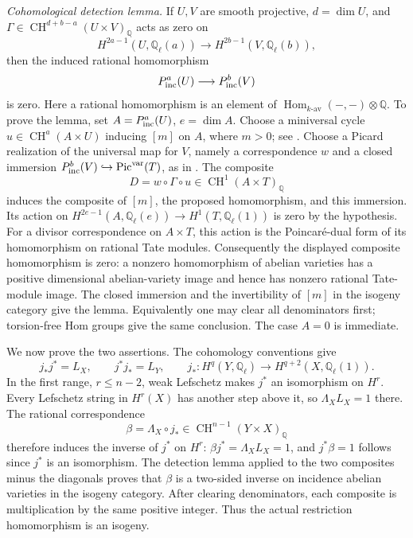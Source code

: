 \emph{Cohomological detection lemma.}
If $U,V$ are smooth projective, $d=\dim U$, and
$\Gamma\in\operatorname{CH}^{d+b-a}(U\times V)_{\mathbb Q}$
acts as zero on
\[
 H^{2a-1}(U,\mathbb Q_\ell(a))
       \longrightarrow H^{2b-1}(V,\mathbb Q_\ell(b)),
\]
then the induced rational homomorphism
\[
 P^a_{\rm inc}(U)\longrightarrow P^b_{\rm inc}(V)
\]
is zero. Here a rational homomorphism is an element of
$\operatorname{Hom}_{k\text{-av}}(-,-)\otimes\mathbb Q$.
To prove the lemma, set $A=P^a_{\rm inc}(U)$, $e=\dim A$.
Choose a miniversal cycle
$u\in\operatorname{CH}^a(A\times U)$ inducing $[m]$ on $A$,
where $m>0$; see \cite[Lemma 2.3, pp.~104--105]{DGJ_Saito1979}.
Choose a Picard realization of the universal map for $V$, namely
a correspondence $w$ and a closed immersion
$P^b_{\rm inc}(V)\hookrightarrow\operatorname{Pic}^{\rm var}(T)$,
as in \cite[(3.5), p.~110]{DGJ_Saito1979}. The composite
\[
 D=w\circ\Gamma\circ u\in
               \operatorname{CH}^1(A\times T)_{\mathbb Q}
\]
induces the composite of $[m]$, the proposed homomorphism, and
this immersion. Its action on
$H^{2e-1}(A,\mathbb Q_\ell(e))\to
H^1(T,\mathbb Q_\ell(1))$ is zero by the hypothesis.
For a divisor correspondence on $A\times T$, this action is the
Poincaré-dual form of its homomorphism on rational Tate modules.
Consequently the displayed composite homomorphism is zero:
a nonzero homomorphism of abelian varieties has a positive
dimensional abelian-variety image and hence has nonzero rational
Tate-module image. The closed immersion and the invertibility
of $[m]$ in the isogeny category give the lemma. Equivalently one
may clear all denominators first; torsion-free Hom groups give
the same conclusion. The case $A=0$ is immediate.

We now prove the two assertions. The cohomology conventions give
\[
 j_*j^*=L_X,\qquad j^*j_*=L_Y,
 \qquad
 j_*:H^q(Y,\mathbb Q_\ell)
         \longrightarrow H^{q+2}(X,\mathbb Q_\ell(1)).
\]
In the first range, $r\leq n-2$, weak Lefschetz makes $j^*$ an
isomorphism on $H^r$. Every Lefschetz string in $H^r(X)$ has
another step above it, so $\Lambda_X L_X=1$ there. The rational
correspondence
\[
 \beta=\Lambda_X\circ j_*\in
           \operatorname{CH}^{n-1}(Y\times X)_{\mathbb Q}
\]
therefore induces the inverse of $j^*$ on $H^r$:
$\beta j^*=\Lambda_XL_X=1$, and $j^*\beta=1$ follows since
$j^*$ is an isomorphism. The detection lemma applied to the two
composites minus the diagonals proves that $\beta$ is a two-sided
inverse on incidence abelian varieties in the isogeny category.
After clearing denominators, each composite is multiplication
by the same positive integer. Thus the actual restriction
homomorphism is an isogeny.

